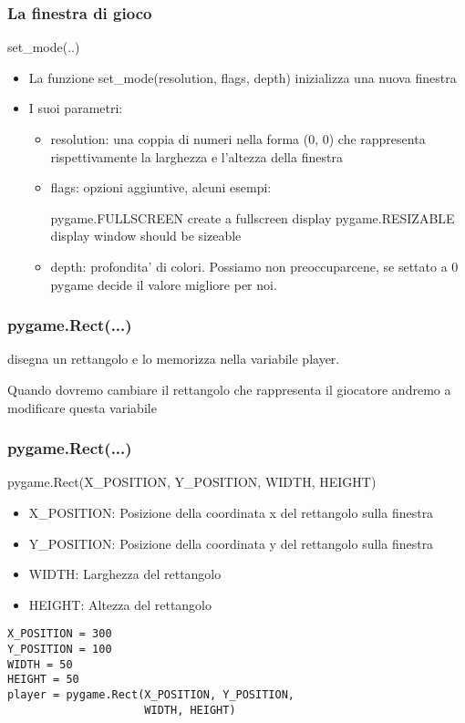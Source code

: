 \documentclass{beamer}
\begin{document}
\begin{frame}[fragile]
    \frametitle{La finestra di gioco}
    
    \begin{block}{set\_mode(..)}
        \begin{itemize}
            \item La funzione set\_mode(resolution, flags, depth) inizializza una nuova finestra
            \item I suoi parametri:
                
                \begin{itemize}
                    \item resolution: una coppia di numeri nella forma (0, 0) che rappresenta rispettivamente la larghezza e l'altezza della finestra
                    
                    \item flags: opzioni aggiuntive, alcuni esempi:
                    
                    pygame.FULLSCREEN    create a fullscreen display
                    pygame.RESIZABLE     display window should be sizeable

                    \item depth: profondita' di colori. Possiamo non preoccuparcene, se settato a 0 pygame decide il valore migliore per noi.
                \end{itemize}
        \end{itemize}
    \end{block}

\end{frame}

\begin{frame}[fragile]
    \frametitle{pygame.Rect(...)}
    disegna un rettangolo e lo memorizza nella variabile player.
    
    Quando dovremo cambiare il rettangolo che rappresenta il giocatore andremo a modificare questa variabile
\end{frame}    
    
\begin{frame}[fragile]
    \frametitle{pygame.Rect(...)}
    \begin{block}{pygame.Rect(X\_POSITION, Y\_POSITION, WIDTH, HEIGHT)}
        \begin{itemize}
            \item X\_POSITION: Posizione della coordinata x del rettangolo sulla finestra
            \item Y\_POSITION: Posizione della coordinata y del rettangolo sulla finestra
            \item WIDTH: Larghezza del rettangolo
            \item HEIGHT: Altezza del rettangolo
        \end{itemize}
    \end{block}
    \begin{lstlisting}
X_POSITION = 300
Y_POSITION = 100
WIDTH = 50
HEIGHT = 50
player = pygame.Rect(X_POSITION, Y_POSITION, 
                     WIDTH, HEIGHT)
    \end{lstlisting}
\end{frame}
\end{document}
